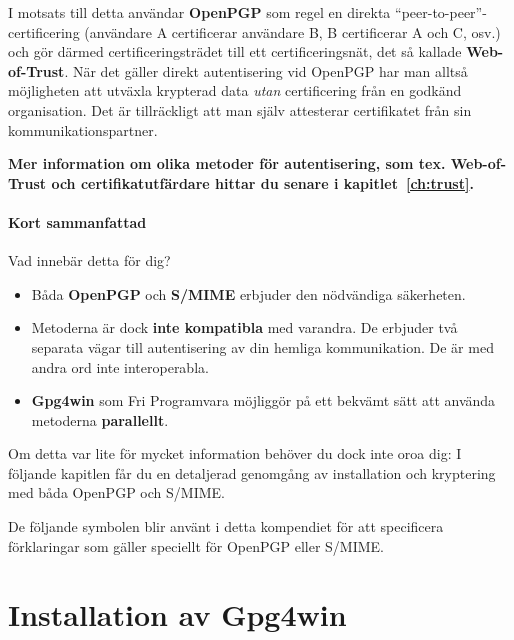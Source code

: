 \documentclass[a4paper,11pt, oneside,openright,titlepage,dvips]{scrbook}
\newcommand{\IncludeImage}[2][]{\texorhtml{%
\texttt{[image: \#2]}%
}{%
\htmlimg{#2.png}%
}}
\newcounter{part}
\newcounter{chapter}
\newcounter{section}[chapter]
\begin{document}
I motsats till detta användar \textbf{OpenPGP} som regel en direkta
"`peer-to-peer"'-certificering (användare A certificerar användare B,
B certificerar A och C, osv.) och gör därmed certificeringsträdet till
ett certificeringsnät, det så kallade \textbf{Web-of-Trust}. När det
gäller direkt autentisering vid OpenPGP har man alltså möjligheten att
utväxla krypterad data \textit{utan} certificering från en godkänd 
organisation. Det är tillräckligt att man själv attesterar certifikatet
från sin kommunikationspartner.

\textbf{Mer information om olika metoder för autentisering, 
som tex. Web-of-Trust och certifikatutfärdare hittar du senare 
i kapitlet~\ref{ch:trust}.}


\clearpage
\subsubsection{Kort sammanfattad}

Vad innebär detta för dig?
\begin{itemize}
\item Båda \textbf{OpenPGP} och \textbf{S/MIME} erbjuder den nödvändiga
    säkerheten.
\item Metoderna är dock \textbf{inte kompatibla} med varandra. De 
    erbjuder två separata vägar till autentisering av din hemliga kommunikation.
    De är med andra ord inte interoperabla.
\item \textbf{Gpg4win} som Fri Programvara möjliggör på ett bekvämt sätt att
använda metoderna \textbf{parallellt}.
\end{itemize}

Om detta var lite för mycket information behöver du dock inte oroa dig: I
följande kapitlen får du en detaljerad genomgång av installation och 
kryptering med båda OpenPGP och S/MIME.

De följande symbolen blir använt i detta kompendiet för att specificera
förklaringar som gäller speciellt för OpenPGP eller S/MIME.

\begin{center}
\IncludeImage[width=3cm]{openpgp-icon}
\hspace{1cm}
\IncludeImage[width=3cm]{smime-icon}
\end{center}



\clearpage
{}
\chapter{Installation av Gpg4win}
\end{document}
